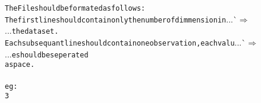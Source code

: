 {{\begin{tabbing}
{\texttt{\hspace{48pt}The\hspace{6pt}File\hspace{6pt}should\hspace{6pt}be\hspace{6pt}formated\hspace{6pt}as\hspace{6pt}follows:}}\\
{\texttt{\hspace{48pt}The\hspace{6pt}first\hspace{6pt}line\hspace{6pt}should\hspace{6pt}contain\hspace{6pt}only\hspace{6pt}the\hspace{6pt}number\hspace{6pt}of\hspace{6pt}dimmension\hspace{6pt}in}}{}...\`$\Rightarrow$\\
...{}{\texttt{\hspace{6pt}the\hspace{6pt}data\hspace{6pt}set.}}\\
{\texttt{\hspace{48pt}Each\hspace{6pt}subsequant\hspace{6pt}line\hspace{6pt}should\hspace{6pt}contain\hspace{6pt}one\hspace{6pt}observation,\hspace{6pt}each\hspace{6pt}valu}}{}...\`$\Rightarrow$\\
...{}{\texttt{e\hspace{6pt}should\hspace{6pt}be\hspace{6pt}seperated}}\\
{\texttt{\hspace{48pt}a\hspace{6pt}space.}}\\
\\
{\texttt{\hspace{48pt}eg:}}\\
{\texttt{\hspace{48pt}3}}\\

\end{tabbing}}}
